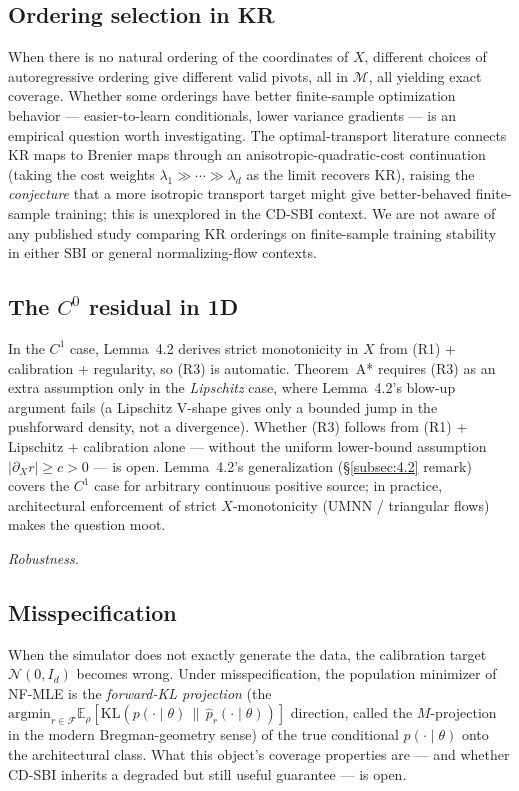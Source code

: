 \documentclass[11pt]{article}
\begin{document}
\subsection{Ordering selection in KR}\label{subsec:11.2}
When there is no natural
ordering of the coordinates of \(X\), different choices of
autoregressive ordering give different valid pivots, all in
\(\mathcal{M}\), all yielding exact coverage. Whether some orderings
have better finite-sample optimization behavior --- easier-to-learn
conditionals, lower variance gradients --- is an empirical question
worth investigating. The optimal-transport literature
\citep{CarlierEtAl2010} connects KR maps to Brenier maps through an
anisotropic-quadratic-cost continuation (taking the cost weights
\(\lambda_1 \gg \cdots \gg \lambda_d\) as the limit recovers KR), raising
the
\emph{conjecture} that a more isotropic transport target might give
better-behaved finite-sample training; this is unexplored in the CD-SBI
context. We are not aware of any published study comparing KR orderings
on finite-sample training stability in either SBI or general
normalizing-flow contexts.

\subsection{The \(C^0\) residual in 1D}\label{subsec:11.3}
In the \(C^1\) case, Lemma~4.2 derives strict monotonicity in \(X\) from
(R1) + calibration + regularity, so (R3) is automatic. Theorem~A*
requires (R3) as an extra assumption only in the \emph{Lipschitz} case,
where Lemma~4.2's blow-up argument fails (a Lipschitz V-shape gives only
a bounded jump in the pushforward density, not a divergence). Whether
(R3) follows from (R1) + Lipschitz + calibration alone --- without the
uniform lower-bound assumption \(|\partial_X r| \ge c > 0\) --- is open.
Lemma~4.2's generalization (\S\ref{subsec:4.2} remark) covers the
\(C^1\) case for arbitrary continuous positive source; in practice,
architectural enforcement of strict \(X\)-monotonicity (UMNN /
triangular flows) makes the question moot.

\medskip
\noindent\textit{Robustness.}
\medskip

\subsection{Misspecification}\label{subsec:11.4}
When the simulator does not exactly generate the data, the calibration
target \(\mathcal{N}(0, I_d)\) becomes wrong. Under misspecification,
the population minimizer of NF-MLE is the \emph{forward-KL projection}
(the
\(\mathrm{argmin}_{r \in \mathcal{F}} \mathbb{E}_\rho[\mathrm{KL}(p(\cdot \mid \theta) \,\|\, \hat p_r(\cdot \mid \theta))]\)
direction, called the \(M\)-projection in the modern Bregman-geometry
sense) of the true conditional \(p(\cdot \mid \theta)\) onto the
architectural class. What this object's coverage properties are ---
and whether CD-SBI inherits a degraded but still useful guarantee ---
is open.
\end{document}
